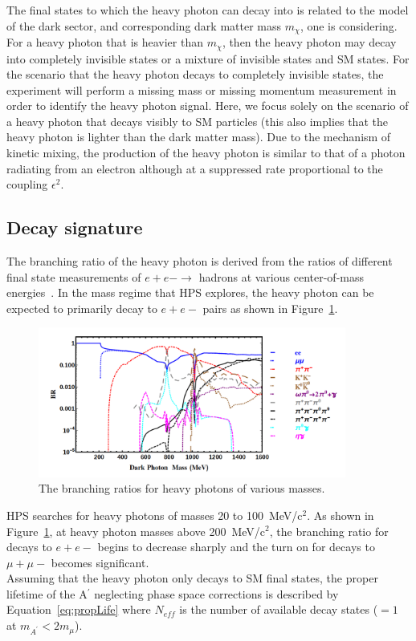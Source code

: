 The final states to which the heavy photon can decay into is related to the model of the dark sector, and corresponding dark matter mass $m_{\chi}$, one is considering. For a heavy photon that is heavier than $m_{\chi}$, then the heavy photon may decay into completely invisible states or a mixture of invisible states and SM states. For the scenario that the heavy photon decays to completely invisible states, the experiment will perform a missing mass or missing momentum measurement in order to identify the heavy photon signal. Here, we focus solely on the scenario of a heavy photon that decays visibly to SM particles (this also implies that the heavy photon is lighter than the dark matter mass). Due to the mechanism of kinetic mixing, the production of the heavy photon is similar to that of a photon radiating from an electron although at a suppressed rate proportional to the coupling $\epsilon^2$. 

\subsection{Decay signature}
The branching ratio of the heavy photon is derived from the ratios of different final state measurements of $e+e-\rightarrow$ hadrons at various center-of-mass energies~\cite{liu_signals_2015}. In the mass regime that HPS explores, the heavy photon can be expected to primarily decay to $e+e-$ pairs as shown in Figure~\ref{Figure:br}. 

\begin{figure}[H]
  \centering
      \includegraphics[width=0.9\textwidth]{pics/motivation/branchingRatio.png}
  \caption[The branching ratios for heavy photon decays]{The branching ratios for heavy photons of various masses.~\cite{liu_signals_2015}}
  \label{Figure:br}
\end{figure}

HPS searches for heavy photons of masses 20 to 100~MeV/c$^2$. As shown in Figure~\ref{Figure:br}, at heavy photon masses above 200~MeV/c$^2$, the branching ratio for decays to $e+e-$ begins to decrease sharply and the turn on for decays to $\mu+\mu-$ becomes significant. \\
\indent Assuming that the heavy photon only decays to SM final states, the proper lifetime of the A$^{\prime}$ neglecting phase space corrections is described by Equation~\eqref{eq:propLife} where $N_{eff}$ is the number of available decay states ($=1$ at $m_{A^{\prime}}<2m_{\mu}$).~\cite{toro} 

